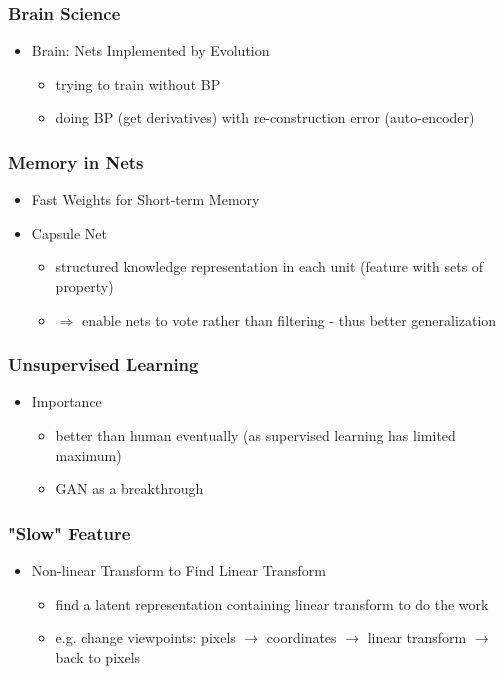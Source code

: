 \subsubsection{Brain Science}
\begin{itemize}
\item Brain: Nets Implemented by Evolution
	\begin{itemize}
	\item trying to train without BP
	\item doing BP (get derivatives) with re-construction error (auto-encoder)
	\end{itemize}
\end{itemize}

\subsubsection{Memory in Nets}
\begin{itemize}
\item Fast Weights for Short-term Memory
\item Capsule Net
	\begin{itemize}
	\item structured knowledge representation in each unit (feature with sets of property)
	\item $\Rightarrow$ enable nets to vote rather than filtering - thus better generalization
	\end{itemize}
\end{itemize}

\subsubsection{Unsupervised Learning}
\begin{itemize}
\item Importance
	\begin{itemize}
	\item better than human eventually (as supervised learning has limited maximum)
	\item GAN as a breakthrough
	\end{itemize}
\end{itemize}

\subsubsection{"Slow" Feature}
\begin{itemize}
\item Non-linear Transform to Find Linear Transform
	\begin{itemize}
	\item find a latent representation containing linear transform to do the work
	\item e.g. change viewpoints: pixels $\rightarrow$ coordinates $\rightarrow$ linear transform $\rightarrow$ back to pixels
	\end{itemize}
\end{itemize}

